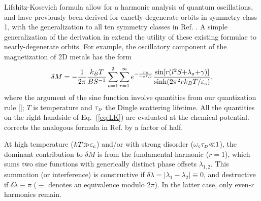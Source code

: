 \documentclass[aps, prb, showpacs, twocolumn, notitlepage, superscriptaddress]{revtex4-1}
\begin{document}
Lifshitz-Kosevich formula\cite{lifshitz_kosevich,lifshitz_kosevich_jetp} allow for a harmonic analysis of quantum oscillations, and have previously been derived for  exactly-degenerate orbits in symmetry class 1\cite{rothmag}, with the generalization to all ten symmetry classes in Ref. . A simple generalization of the derivation in  extend the utility of these existing formulae to nearly-degenerate orbits. For example, the oscillatory component of the magnetization of 2D metals has the form
\begin{equation}
\delta M=-\frac{1}{2\pi}\frac{k_BT}{BS^{-1}}\sum_{a=1}^2\sum_{r=1}^{\infty}e^{-\frac{r\pi}{\omega_c\tau_{\scriptscriptstyle{D}}}} \frac{\text{sin}[r(l^2S{+}\lambda_a{+}\gamma)]}{\text{sinh}(2\pi^2rk_BT/\varepsilon_c)},\label{eq:LK}
\end{equation}
where the argument of the sine function involve quantities from our quantization rule []; $T$ is temperature and $\tau_{\scriptscriptstyle{D}}$  the Dingle scattering lifetime\cite{Dingle_collisions}. All the quantities on the right handside of Eq.\ (\ref{eq:LK}) are evaluated at the chemical potential.  corrects the analogous formula in Ref.  by a factor of half. 


At high temperature ($kT{\gg}\varepsilon_c$) and/or with strong disorder ($\omega_c\tau_{\scriptscriptstyle{D}}{\ll}1$), the dominant contribution to $\delta M$ is from the fundamental harmonic ($r{=}1$), which sums two sine functions with generically distinct phase offsets $\lambda_{1,2}$. This summation (or interference) is constructive if $\delta \lambda{=}|\lambda_1{-}\lambda_2|{\equiv}0$, and destructive if $\delta \lambda{\equiv}\pi$  ($\equiv$ denotes an equivalence modulo $2\pi$). In the latter case, only even-$r$ harmonics remain. 

\end{document}
